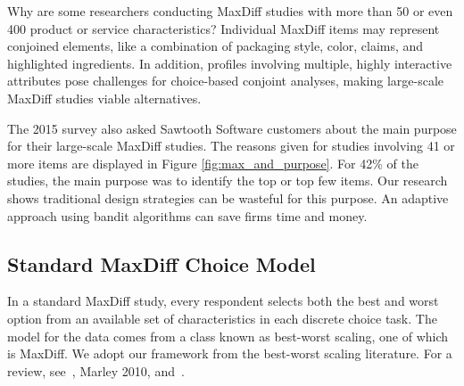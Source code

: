 \documentclass[a4paper,11pt]{article}
\begin{document}
Why are some researchers conducting MaxDiff studies with more than 50 or even 400 product or service characteristics? Individual MaxDiff items may represent conjoined elements, like a combination of packaging style, color, claims, and highlighted ingredients. In addition, profiles involving multiple, highly interactive attributes pose challenges for choice-based conjoint analyses, making large-scale MaxDiff studies viable alternatives.

The 2015 survey also asked Sawtooth Software customers about the main purpose for their large-scale MaxDiff  studies. The reasons given for studies involving 41 or more items are displayed in Figure \ref{fig:max_and_purpose}. For 42\% of the studies, the main purpose was to identify the top or top few items. Our research shows traditional design strategies can be wasteful for this purpose. An adaptive approach using bandit algorithms can save firms time and money.


\subsection{Standard MaxDiff Choice Model}

In a standard MaxDiff study, every respondent selects both the best and worst option from an available set of characteristics in each discrete choice task. The model for the data comes from a class known as best-worst scaling, one of which is MaxDiff. We adopt our framework from the best-worst scaling literature. For a review, see~\cite{marley2012models}, Marley 2010, and~\cite{marley2005some}. 
\end{document}

